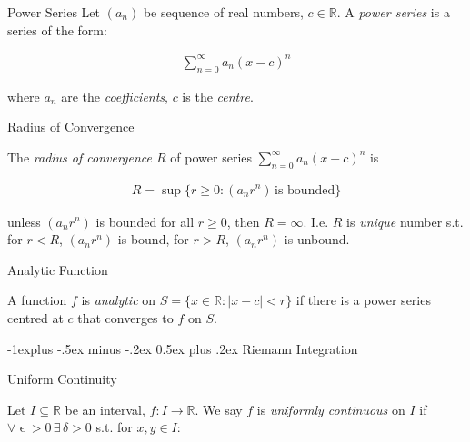 \documentclass[10pt]{article} %
\makeatletter
\renewcommand{\geq}{\geqslant}
\renewcommand{\subsection}{\@startsection{subsection}{2}{0mm}%
                                {-1explus -.5ex minus -.2ex}%
                                {0.5ex plus .2ex}%
                                {\normalfont\normalsize\bfseries}}
\makeatother
\begin{document}
\begin{multicols}{3}
\begin{definition}{}{Power Series}
    Let $(a_n)$ be sequence of real numbers, $c \in \mathbb{R}$. A \emph{power series} is a series of the form:

        \begin{align*}
            \sum_{n=0}^{\infty} a_n (x - c)^n
        \end{align*}

    where $a_n$ are the \emph{coefficients}, $c$ is the \emph{centre}.

\end{definition}

\begin{definition}{}{Radius of Convergence}

    The \emph{radius of convergence $R$} of power series $\sum_{n=0}^{\infty} a_n (x - c)^n$ is

        \begin{align*}
            R = \sup\{r \geq 0: (a_nr^n) \,\textrm{is bounded}\}
        \end{align*}

    unless $(a_nr^n)$ is bounded for all $r \geq 0$, then $R = \infty$. I.e. $R$ is \emph{unique} number s.t. for $r < R$, $(a_nr^n)$ is bound, for $r > R$, $(a_nr^n)$ is unbound.

\end{definition}

\begin{definition}{}{Analytic Function}

    A function $f$ is \emph{analytic} on $S = \{ x \in \mathbb{R}: |x - c| < r\}$ if there is a power series centred at $c$ that converges to $f$ on $S$.

\end{definition}


\subsection{Riemann Integration}

\begin{definition}{}{Uniform Continuity}

    Let $I \subseteq \mathbb{R}$ be an interval, $f: I \to \mathbb{R}$. We say $f$ is \emph{uniformly continuous} on $I$ if $\forall \upvarepsilon > 0 \, \exists\, \delta > 0$ s.t. for $x,y \in I$:


\end{definition}
\end{multicols}
\end{document}
